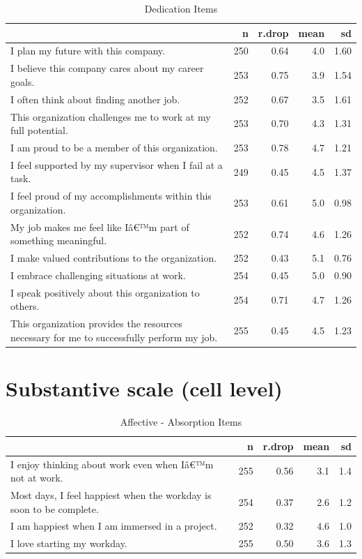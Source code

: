 \documentclass[
]{book}
\begin{document}
\begin{table}

\caption{\label{tab:rdrop6}Dedication Items}
\centering
\begin{tabular}[t]{l|r|r|r|r}
\hline
  & n & r.drop & mean & sd\\
\hline
I plan my future with this company. & 250 & 0.64 & 4.0 & 1.60\\
\hline
I believe this company cares about my career goals. & 253 & 0.75 & 3.9 & 1.54\\
\hline
I often think about finding another job. & 252 & 0.67 & 3.5 & 1.61\\
\hline
This organization challenges me to work at my full potential. & 253 & 0.70 & 4.3 & 1.31\\
\hline
I am proud to be a member of this organization. & 253 & 0.78 & 4.7 & 1.21\\
\hline
I feel supported by my supervisor when I fail at a task. & 249 & 0.45 & 4.5 & 1.37\\
\hline
I feel proud of my accomplishments within this organization. & 253 & 0.61 & 5.0 & 0.98\\
\hline
My job makes me feel like Iâ€™m part of something meaningful. & 252 & 0.74 & 4.6 & 1.26\\
\hline
I make valued contributions to the organization. & 252 & 0.43 & 5.1 & 0.76\\
\hline
I embrace challenging situations at work. & 254 & 0.45 & 5.0 & 0.90\\
\hline
I speak positively about this organization to others. & 254 & 0.71 & 4.7 & 1.26\\
\hline
This organization provides the resources necessary for me to successfully perform my job. & 255 & 0.45 & 4.5 & 1.23\\
\hline
\end{tabular}
\end{table}

\hypertarget{substantive-scale-cell-level}{%
\section{Substantive scale (cell level)}\label{substantive-scale-cell-level}}

\begin{table}

\caption{\label{tab:rdrop7}Affective - Absorption Items}
\centering
\begin{tabular}[t]{l|r|r|r|r}
\hline
  & n & r.drop & mean & sd\\
\hline
I enjoy thinking about work even when Iâ€™m not at work. & 255 & 0.56 & 3.1 & 1.4\\
\hline
Most days, I feel happiest when the workday is soon to be complete. & 254 & 0.37 & 2.6 & 1.2\\
\hline
I am happiest when I am immersed in a project. & 252 & 0.32 & 4.6 & 1.0\\
\hline
I love starting my workday. & 255 & 0.50 & 3.6 & 1.3\\
\hline
\end{tabular}
\end{table}
\end{document}

